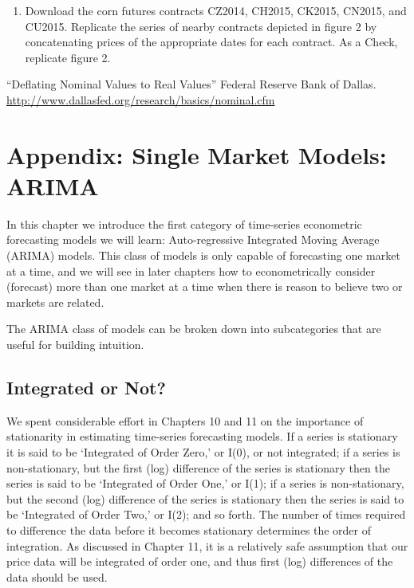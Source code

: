 \documentclass[
]{book}
\providecommand{\tightlist}{%
  \setlength{\itemsep}{0pt}\setlength{\parskip}{0pt}}
\begin{document}
\begin{enumerate}
\def\labelenumi{\arabic{enumi}.}
\tightlist
\item
  Download the corn futures contracts CZ2014, CH2015, CK2015, CN2015, and CU2015. Replicate the series of nearby contracts depicted in figure 2 by concatenating prices of the appropriate dates for each contract. As a Check, replicate figure 2.
\end{enumerate}

``Deflating Nominal Values to Real Values'' Federal Reserve Bank of Dallas. \url{http://www.dallasfed.org/research/basics/nominal.cfm}

\hypertarget{appendix-single-market-models-arima}{%
\chapter{Appendix: Single Market Models: ARIMA}\label{appendix-single-market-models-arima}}

In this chapter we introduce the first category of time-series econometric forecasting models we will learn: Auto-regressive Integrated Moving Average (ARIMA) models. This class of models is only capable of forecasting one market at a time, and we will see in later chapters how to econometrically consider (forecast) more than one market at a time when there is reason to believe two or markets are related.

The ARIMA class of models can be broken down into subcategories that are useful for building intuition.

\hypertarget{integrated-or-not}{%
\section{Integrated or Not?}\label{integrated-or-not}}

We spent considerable effort in Chapters 10 and 11 on the importance of stationarity in estimating time-series forecasting models. If a series is stationary it is said to be `Integrated of Order Zero,' or I(0), or not integrated; if a series is non-stationary, but the first (log) difference of the series is stationary then the series is said to be `Integrated of Order One,' or I(1); if a series is non-stationary, but the second (log) difference of the series is stationary then the series is said to be `Integrated of Order Two,' or I(2); and so forth. The number of times required to difference the data before it becomes stationary determines the order of integration. As discussed in Chapter 11, it is a relatively safe assumption that our price data will be integrated of order one, and thus first (log) differences of the data should be used.
\end{document}
